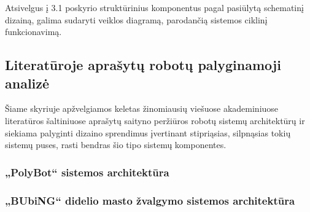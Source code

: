 Atsivelgus į 3.1 poskyrio struktūrinius komponentus pagal \cite{StanfWebCrawl} pasiūlytą schematinį dizainą, galima sudaryti veiklos diagramą, parodančią sistemos ciklinį funkcionavimą.



\subsection{Literatūroje aprašytų robotų palyginamoji analizė}

Šiame skyriuje apžvelgiamos keletas žinomiausių viešuose akademiniuose literatūros šaltiniuose aprašytų saityno peržiūros robotų sistemų architektūrų ir siekiama palyginti dizaino sprendimus įvertinant stipriąsias, silpnąsias tokių sistemų puses, rasti bendras šio tipo sistemų komponentes.



\subsubsection{„PolyBot“ sistemos architektūra}
\subsubsection{„BUbiNG“ didelio masto žvalgymo sistemos architektūra}